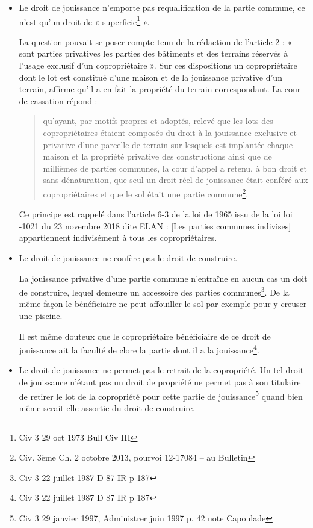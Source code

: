 			\begin{itemize}
				\item Le droit de jouissance n’emporte pas requalification de la partie commune, ce n’est qu’un droit de
				« superficie\footnote{Civ 3\degre{} 29 oct 1973 Bull Civ III } ».
				
				La question pouvait se poser compte tenu de la rédaction de l’article 2 : « sont parties privatives
				les parties des bâtiments et des terrains réservés à l’usage exclusif d’un copropriétaire ». Sur ces
				dispositions un copropriétaire dont le lot est constitué d’une maison et de la jouissance privative
				d’un terrain, affirme qu’il a en fait la propriété du terrain correspondant. La cour de cassation
				répond :
				\begin{quote}
					qu’ayant, par motifs propres et adoptés, relevé que les lots des copropriétaires étaient
					composés du droit à la jouissance exclusive et privative d’une parcelle de terrain sur
					lesquels est implantée chaque maison et la propriété privative des constructions ainsi que
					de millièmes de parties communes, la cour d’appel a retenu, à bon droit et sans
					dénaturation, que seul un droit réel de jouissance était conféré aux copropriétaires et que
					le sol était une partie commune\footnote{Civ. 3ème Ch. 2 octobre 2013, \no pourvoi 12-17084 – au Bulletin}.
				\end{quote}
				
				Ce principe est rappelé dans l’article 6-3 de la loi de 1965 issu de la loi loi -1021 du 23
				novembre 2018 dite ELAN :
				[Les parties communes indivises] appartiennent indivisément à tous les copropriétaires.
				
				\item  Le droit de jouissance ne confère pas le droit de construire.
				
				La jouissance privative d’une partie commune n’entraîne en aucun cas un doit de construire, lequel
				demeure un accessoire des parties communes\footnote{Civ 3\degre{} 22 juillet 1987 D 87 IR p 187}. De la même façon le bénéficiaire ne peut affouiller le sol
				par exemple pour y creuser une piscine.
				
				Il est même douteux que le copropriétaire bénéficiaire de ce droit de jouissance ait la faculté de clore la
				partie dont il a la jouissance\footnote{Civ 3\degre{} 22 juillet 1987 D 87 IR p 187}.
			
				\item  Le droit de jouissance ne permet pas le retrait de la copropriété.
				Un tel droit de jouissance n’étant pas un droit de propriété ne permet pas à son titulaire de retirer le lot
				de la copropriété pour cette partie de jouissance\footnote{Civ 3\degre{} 29 janvier 1997, Administrer juin 1997 p. 42 note Capoulade} quand bien même serait-elle assortie du droit de
				construire.
			\end{itemize}
		
